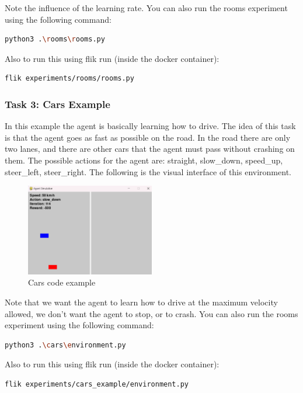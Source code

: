 Note the influence of the learning rate. You can also run the rooms experiment using the following command:

\begin{lstlisting}[language=bash]
python3 .\rooms\rooms.py
\end{lstlisting}

Also to run this using flik run (inside the docker container):

\begin{lstlisting}[language=bash]
flik experiments/rooms/rooms.py
\end{lstlisting}

\subsubsection{Task 3: Cars Example}

In this example the agent is basically learning how to drive. The idea of this task is that the agent 
goes as fast as possible on the road. In the road there are only two lanes, and there are other cars 
that the agent must pass without crashing on them. The possible actions for the agent are: straight, 
slow\_down, speed\_up, steer\_left, steer\_right. The following is the visual interface of this environment.

\begin{figure}[h]
    \centering
    \includegraphics[width=0.5\textwidth]{figures/cars_example.png}
    \caption{Cars code example}
    \label{fig:cars-code-example}
\end{figure}

Note that we want the agent to learn how to drive at the maximum velocity allowed, we don’t want 
the agent to stop, or to crash. You can also run the rooms experiment using the following command:

\begin{lstlisting}[language=bash]
python3 .\cars\environment.py
\end{lstlisting}

Also to run this using flik run (inside the docker container):

\begin{lstlisting}[language=bash]
flik experiments/cars_example/environment.py
\end{lstlisting}



\endinput

